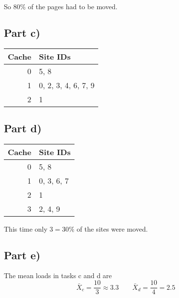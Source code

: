 \documentclass[10pt,a4paper]{article}
\begin{document}
So $80\%$ of the pages had to be moved.

\subsection*{Part c)}

\begin{tabular}{rl}
Cache & Site IDs\\
\hline
0 & 5, 8\\
1 & 0, 2, 3, 4, 6, 7, 9\\
2 & 1\\
\end{tabular}
\begin{comment}
#+ORGTBL: SEND exercise-2-c orgtbl-to-latex :splice nil :skip 0
| Cache | Site IDs            |
|-------+---------------------|
|     0 | 5, 8                |
|     1 | 0, 2, 3, 4, 6, 7, 9 |
|     2 | 1                   |
\end{comment}

\subsection*{Part d)}

\begin{tabular}{rl}
Cache & Site IDs\\
\hline
0 & 5, 8\\
1 & 0, 3, 6, 7\\
2 & 1\\
3 & 2, 4, 9\\
\end{tabular}
\begin{comment}
#+ORGTBL: SEND exercise-2-d orgtbl-to-latex :splice nil :skip 0
| Cache | Site IDs   |
|-------+------------|
|     0 | 5, 8       |
|     1 | 0, 3, 6, 7 |
|     2 | 1          |
|     3 | 2, 4, 9    |
\end{comment}

This time only $3 = 30\%$ of the sites were moved.

\subsection*{Part e)}

The mean loads in tasks c and d are
\begin{equation*}
  \bar{X}_{c} = \frac{10}{3} \approx 3.3 \qquad \bar{X}_{d} = \frac{10}{4} = 2.5
\end{equation*}
\end{document}
